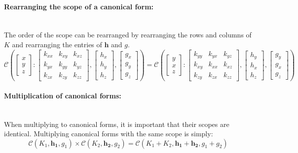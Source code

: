\documentclass[12pt,oneside,openany,a4paper, %
afrikaans,english,
]{memoir}
\numberwithin{equation}{chapter}
\begin{document}
\paragraph{Rearranging the scope of a canonical form:}\mbox{}\\
The order of the scope can be rearranged by rearranging the rows and columns of $K$  and rearranging the entries of $\bm{h}$ and $g$.
\begin{equation}
\mathcal{C}\left(
\begin{bmatrix}
x\\
y\\
z
\end{bmatrix}:
\begin{bmatrix}
k_{xx} & k_{xy} & k_{xz}\\
k_{yx} & k_{yy} & k_{yz}\\
k_{zx} & k_{zy} & k_{zz}
\end{bmatrix},
\begin{bmatrix}
h_x\\
h_y\\
h_z
\end{bmatrix},
\begin{bmatrix}
g_x\\
g_y\\
g_z
\end{bmatrix}
\right)
=
\mathcal{C}\left(
\begin{bmatrix}
y\\
x\\
z
\end{bmatrix}:
\begin{bmatrix}
k_{yy} & k_{yx} & k_{yz}\\
k_{xy} & k_{xx} & k_{xz}\\
k_{zy} & k_{zx} & k_{zz}
\end{bmatrix},
\begin{bmatrix}
h_y\\
h_x\\
h_z
\end{bmatrix},
\begin{bmatrix}
g_y\\
g_x\\
g_z
\end{bmatrix}
\right)
\end{equation}
\paragraph{Multiplication of canonical forms:}\mbox{}\\
When multiplying to canonical forms, it is important that their scopes are identical. Multiplying canonical forms with the same scope is simply:
\begin{equation}\label{eq:10}
\mathcal{C}(K_1,\bm{h_1},g_1)\times\mathcal{C}(K_2,\bm{h_2},g_2) = \mathcal{C}(K_1 + K_2,\bm{h_1} + \bm{h_2},g_1 + g_2)
\end{equation}
\end{document}
